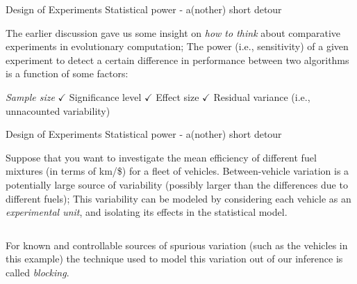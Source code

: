 \documentclass[t]{beamer}
\begin{document}

\begin{ftst}
{Design of Experiments}
{Statistical power - a(nother) short detour}
The earlier discussion gave us some insight on \textit{how to think} about comparative experiments in evolutionary computation;
\vone
The power (i.e., sensitivity) of a given experiment to detect a certain difference in performance between two algorithms is a function of some factors:

\bitems \textit{Sample size} $\checkmark$\pause
\spitem Significance level  $\checkmark$\pause
\spitem Effect size  $\checkmark$\pause
\spitem Residual variance (i.e., unnacounted variability)
\eitem

\end{ftst}


\begin{ftst}
{Design of Experiments}
{Statistical power - a(nother) short detour}
Suppose that you want to investigate the mean efficiency of different fuel mixtures (in terms of km/\$) for a fleet of vehicles.
\vone
Between-vehicle variation is a potentially large source of variability (possibly larger than the differences due to different fuels);
\vone
This variability can be modeled by considering each vehicle as an \textit{experimental unit}, and isolating its effects in the statistical model.
\vone
\begin{columns}
For known and controllable sources of spurious variation (such as the vehicles in this example) the technique used to model this variation out of our inference is called \textit{blocking}.
\end{columns}
\end{ftst}
\end{document}
